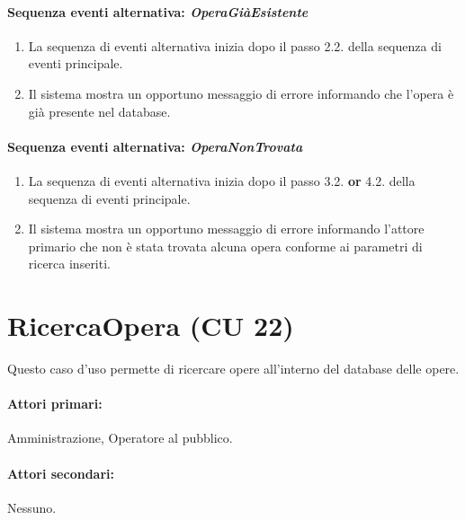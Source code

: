 \documentclass{article}
\begin{document}
	
	\paragraph{Sequenza eventi alternativa: \textit{OperaGiàEsistente}}
	\begin{enumerate}	[leftmargin=28pt]
			\item  La sequenza di eventi alternativa inizia dopo il passo 2.2. della sequenza di eventi principale.
			\item  Il sistema mostra un opportuno messaggio di errore informando che l'opera è già presente nel database.
		\end{enumerate}
		
	\paragraph{Sequenza eventi alternativa: \textit{OperaNonTrovata}}
	\begin{enumerate}	[leftmargin=28pt]
			\item  La sequenza di eventi alternativa inizia dopo il passo 3.2. \textbf{or} 4.2. della sequenza di eventi principale.
			\item  Il sistema mostra un opportuno messaggio di errore informando l'attore primario che non è stata trovata alcuna opera conforme ai parametri di ricerca inseriti.
		\end{enumerate}
	
	
	
	
	
	
	
	
	
	
	
	\pagebreak 
	
	\section*{RicercaOpera (CU 22)}
	
	\indent\indent Questo caso d'uso permette di ricercare opere all'interno del database delle opere.
	
	\paragraph{Attori primari:}Amministrazione, Operatore al pubblico.
	
	\paragraph{Attori secondari:}Nessuno.
	
\end{document}
